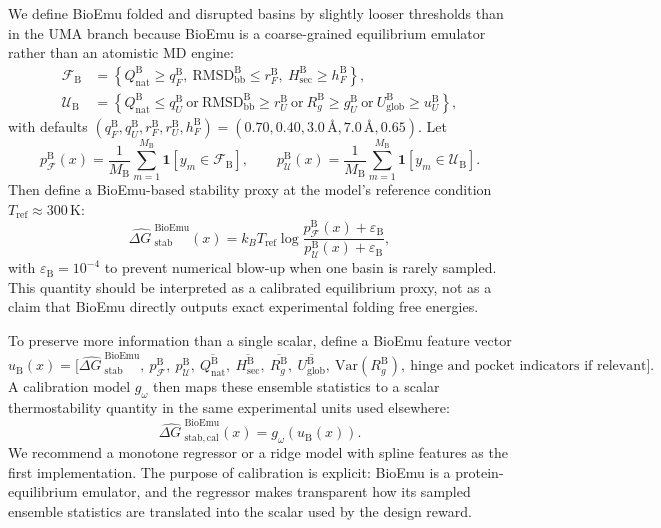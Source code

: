 \documentclass[11pt]{article}
\newcommand{\angstrom}{\ensuremath{\text{\AA}}}
\newcommand{\dG}{\ensuremath{\Delta G \ }}
\begin{document}
We define BioEmu folded and disrupted basins by slightly looser thresholds than in the UMA branch because BioEmu is a coarse-grained equilibrium emulator rather than an atomistic MD engine:
\begin{align}
    \mathcal{F}_{\mathrm B} &= \left\{Q_{\mathrm{nat}}^{\mathrm B}\geq q_F^{\mathrm B},\ \mathrm{RMSD}_{\mathrm{bb}}^{\mathrm B}\leq r_F^{\mathrm B},\ H_{\mathrm{sec}}^{\mathrm B}\geq h_F^{\mathrm B}\right\},\\
    \mathcal{U}_{\mathrm B} &= \left\{Q_{\mathrm{nat}}^{\mathrm B}\leq q_U^{\mathrm B}\ \text{or}\ \mathrm{RMSD}_{\mathrm{bb}}^{\mathrm B}\geq r_U^{\mathrm B}\ \text{or}\ R_g^{\mathrm B}\geq g_U^{\mathrm B}\ \text{or}\ U_{\mathrm{glob}}^{\mathrm B}\geq u_U^{\mathrm B}\right\},
\end{align}
with defaults $(q_F^{\mathrm B},q_U^{\mathrm B},r_F^{\mathrm B},r_U^{\mathrm B},h_F^{\mathrm B})=(0.70,0.40,3.0\,\angstrom,7.0\,\angstrom,0.65)$. Let
\[
p_{\mathcal F}^{\mathrm B}(x)=\frac{1}{M_{\mathrm B}}\sum_{m=1}^{M_{\mathrm B}}\mathbf{1}[y_m\in\mathcal{F}_{\mathrm B}],\qquad
p_{\mathcal U}^{\mathrm B}(x)=\frac{1}{M_{\mathrm B}}\sum_{m=1}^{M_{\mathrm B}}\mathbf{1}[y_m\in\mathcal{U}_{\mathrm B}].
\]
Then define a BioEmu-based stability proxy at the model's reference condition $T_{\mathrm{ref}}\approx 300\,\mathrm K$:
\begin{equation}
\label{eq:bioemu_twostate}
    \widehat{\dG}^{\mathrm{BioEmu}}_{\mathrm{stab}}(x)=k_B T_{\mathrm{ref}} \log \frac{p_{\mathcal F}^{\mathrm B}(x)+\varepsilon_{\mathrm B}}{p_{\mathcal U}^{\mathrm B}(x)+\varepsilon_{\mathrm B}},
\end{equation}
with $\varepsilon_{\mathrm B}=10^{-4}$ to prevent numerical blow-up when one basin is rarely sampled. This quantity should be interpreted as a calibrated equilibrium proxy, not as a claim that BioEmu directly outputs exact experimental folding free energies.

To preserve more information than a single scalar, define a BioEmu feature vector
\begin{equation}
    u_{\mathrm B}(x)=\Big[\widehat{\dG}^{\mathrm{BioEmu}}_{\mathrm{stab}},\ p_{\mathcal F}^{\mathrm B},\ p_{\mathcal U}^{\mathrm B},\ \overline{Q_{\mathrm{nat}}^{\mathrm B}},\ \overline{H_{\mathrm{sec}}^{\mathrm B}},\ \overline{R_g^{\mathrm B}},\ \overline{U_{\mathrm{glob}}^{\mathrm B}},\ \mathrm{Var}(R_g^{\mathrm B}),\ \text{hinge and pocket indicators if relevant}\Big].
\end{equation}
A calibration model $g_\omega$ then maps these ensemble statistics to a scalar thermostability quantity in the same experimental units used elsewhere:
\begin{equation}
    \widehat{\dG}^{\mathrm{BioEmu}}_{\mathrm{stab,cal}}(x)=g_\omega\!\left(u_{\mathrm B}(x)\right).
\end{equation}
We recommend a monotone regressor or a ridge model with spline features as the first implementation. The purpose of calibration is explicit: BioEmu is a protein-equilibrium emulator, and the regressor makes transparent how its sampled ensemble statistics are translated into the scalar used by the design reward.
\end{document}
